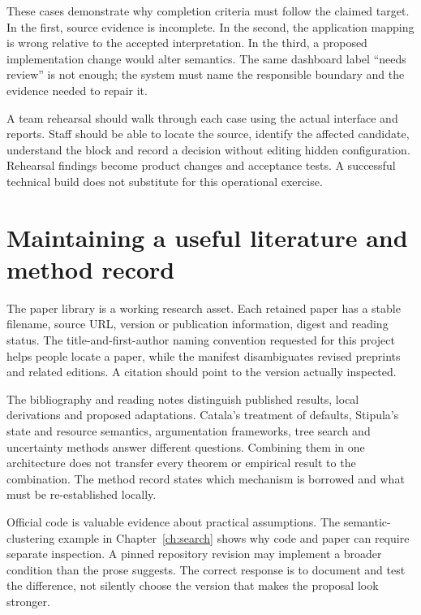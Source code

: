 These cases demonstrate why completion criteria must follow the claimed target.
In the first, source evidence is incomplete. In the second, the application mapping
is wrong relative to the accepted interpretation. In the third, a proposed
implementation change would alter semantics. The same dashboard label ``needs
review'' is not enough; the system must name the responsible boundary and the
evidence needed to repair it.

A team rehearsal should walk through each case using the actual interface and
reports. Staff should be able to locate the source, identify the affected
candidate, understand the block and record a decision without editing hidden
configuration. Rehearsal findings become product changes and acceptance tests.
A successful technical build does not substitute for this operational exercise.

\section{Maintaining a useful literature and method record}
\label{merge:M10:13}


The paper library is a working research asset. Each retained paper has a stable
filename, source URL, version or publication information, digest and reading
status. The title-and-first-author naming convention requested for this project
helps people locate a paper, while the manifest disambiguates revised preprints
and related editions. A citation should point to the version actually inspected.

The bibliography and reading notes distinguish published results, local
derivations and proposed adaptations. Catala's treatment of defaults, Stipula's
state and resource semantics, argumentation frameworks, tree search and uncertainty
methods answer different questions. Combining them in one architecture does not
transfer every theorem or empirical result to the combination. The method record
states which mechanism is borrowed and what must be re-established locally.


Official code is valuable evidence about practical assumptions. The semantic-
clustering example in Chapter~\ref{ch:search} shows why code and paper can require
separate inspection. A pinned repository revision may implement a broader
condition than the prose suggests. The correct response is to document and test
the difference, not silently choose the version that makes the proposal look
stronger.

